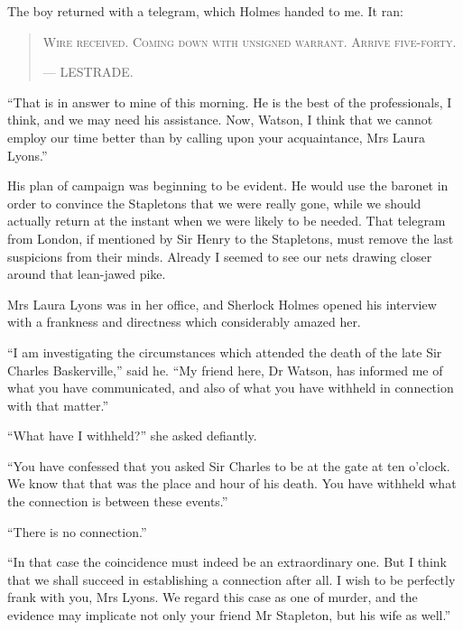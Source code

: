 \documentclass[paper=5.5in:8.5in,BCOR=7mm,twoside,DIV=calc,12pt,usegeometry,openany,chapterprefix,endperiod,headings=big]{scrbook} %
\begin{document}
The boy returned with a telegram, which Holmes handed to me. It ran: 
\begin{samepage}
\blockquote{
\textsc{Wire received. Coming down with unsigned warrant. Arrive five-forty.}
\begin{flushright}
---  {\small\scshape LESTRADE.}
\end{flushright}
}
\end{samepage}

\enquote{That is in answer to mine of this morning. He is the best of the professionals, I think, and we may need his assistance. Now, Watson, I think that we cannot employ our time better than by calling upon your acquaintance, Mrs Laura Lyons.}

His plan of campaign was beginning to be evident. He would use the baronet in order to convince the Stapletons that we were really gone, while we should actually return at the instant when we were likely to be needed. That telegram from London, if mentioned by Sir Henry to the Stapletons, must remove the last suspicions from their minds. Already I seemed to see our nets drawing closer around that lean-jawed pike.

Mrs Laura Lyons was in her office, and Sherlock Holmes opened his interview with a frankness and directness which considerably amazed her.

\enquote{I am investigating the circumstances which attended the death of the late Sir Charles Baskerville,} said he. \enquote{My friend here, Dr Watson, has informed me of what you have communicated, and also of what you have withheld in connection with that matter.}

\enquote{What have I withheld?} she asked defiantly.

\enquote{You have confessed that you asked Sir Charles to be at the gate at ten o'clock. We know that that was the place and hour of his death. You have withheld what the connection is between these events.}

\enquote{There is no connection.}

\enquote{In that case the coincidence must indeed be an extraordinary one. But I think that we shall succeed in establishing a connection after all. I wish to be perfectly frank with you, Mrs Lyons. We regard this case as one of murder, and the evidence may implicate not only your friend Mr Stapleton, but his wife as well.}
\end{document}

